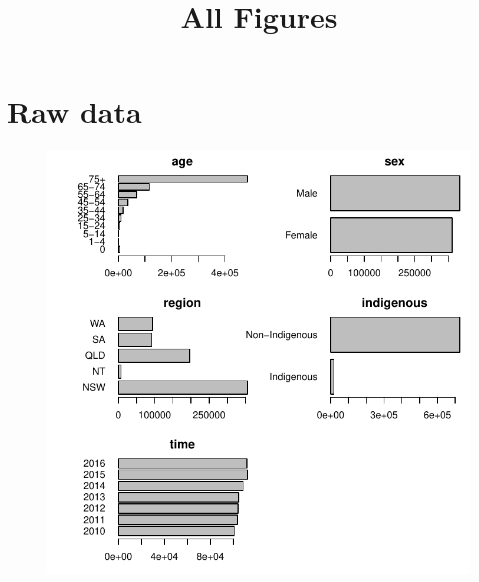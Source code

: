 \documentclass{article}
\begin{document}
\title{All Figures}

\maketitle

\newpage

\section{Raw data}
\newpage

\begin{figure}
  \centering
  \includegraphics{out/fig_data_deaths}
\end{figure}
\newpage
\end{document}
